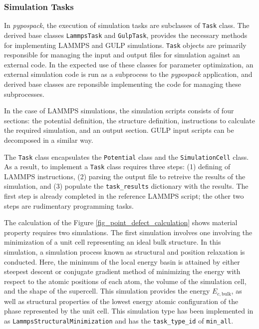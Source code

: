 \subsubsection{Simulation Tasks}
\label{sec:pypospack_tasks}

In \emph{pypospack}, the execution of simulation tasks are subclasses of \verb|Task| class.  The derived base classes \verb|LammpsTask| and \verb|GulpTask|, provides the necessary methods for implementing LAMMPS and GULP simulations. \verb|Task| objects are primarily responsible for managing the input and output files for simulation against an external code.  In the expected use of these classes for parameter optimization, an external simulation code is run as a  subprocess to the  \emph{pypospack} application, and derived base classes are reponsible implementing the code for managing these subprocesses.

In the case of LAMMPS simulations, the simulation scripts consists of four sections:  the potential definition, the structure definition, instructions to calculate the required simulation, and an output section.  GULP input scripts can be decomposed in a similar way.

 The \verb|Task| class encapsulates the \verb|Potential| class and the \verb|SimulationCell| class.  As a result, to implement a \verb|Task| class requires three steps: (1) defining of LAMMPS instructions, (2) parsing the output file to retreive the results of the simulation, and (3) populate the \verb|task_results| dictionary with the results.  The first step is already completed in the reference LAMMPS script; the other two steps are rudimentary programming tasks.

The calculation of the Figure \ref{fig_point_defect_calculation} shows material property requires two simulations.  The first simulation involves one involving the minimization of a unit cell representing an ideal bulk structure.  In this simulation, a simulation process known as structural and position relaxation is conducted.  Here, the  minimum of the local energy basin is attained by either steepest descent or conjugate gradient method of minimizing the energy with respect to the atomic positions of each atom, the volume of the simulation cell, and the shape of the supercell.  This simulation provides the energy $E_{c,\mathrm{bulk}}$, as well as structural properties of the lowest energy atomic configuration of the phase represented by the unit cell.  This simulation type has been implemented in as \verb|LammpsStructuralMinimization| and has the \verb|task_type_id| of \verb|min_all|.

